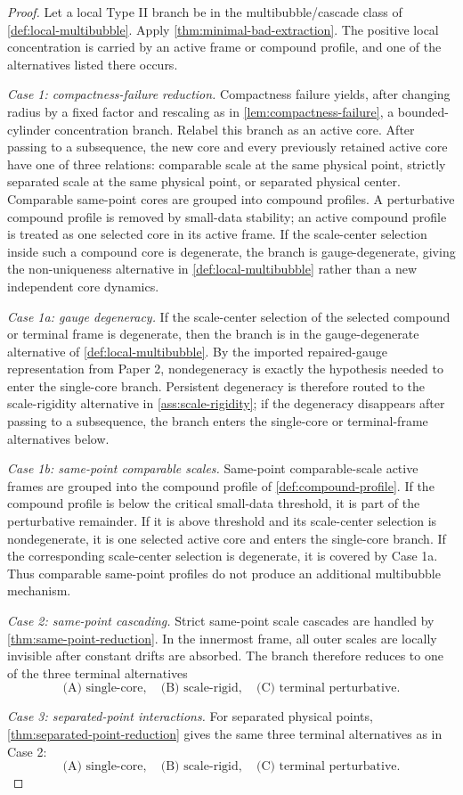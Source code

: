 \documentclass[11pt]{amsart}
\theoremstyle{plain}
\theoremstyle{definition}
\theoremstyle{remark}
\begin{document}
\begin{proof}
Let a local Type II branch be in the multibubble/cascade class of
\cref{def:local-multibubble}.  Apply \cref{thm:minimal-bad-extraction}.  The
positive local concentration is carried by an active frame or compound profile,
and one of the alternatives listed there occurs.
\par
\textit{Case 1: compactness-failure reduction.}
Compactness failure yields, after changing radius by a fixed factor and
rescaling as in \cref{lem:compactness-failure}, a bounded-cylinder concentration
branch.  Relabel this branch as an active core.  After passing to a subsequence,
the new core and every previously retained active core have one of three
relations: comparable scale at the same physical point, strictly separated scale
at the same physical point, or separated physical center.  Comparable same-point
cores are grouped into compound profiles.  A perturbative compound profile is
removed by small-data stability; an active compound profile is treated as one
selected core in its active frame.  If the scale-center selection inside such a
compound core is degenerate, the branch is gauge-degenerate, giving the
non-uniqueness alternative in \cref{def:local-multibubble} rather than a new
independent core dynamics.
\par
\textit{Case 1a: gauge degeneracy.}
If the scale-center selection of the selected compound or terminal frame is
degenerate, then the branch is in the gauge-degenerate alternative of
\cref{def:local-multibubble}.  By the imported repaired-gauge representation
from Paper 2, nondegeneracy is exactly the hypothesis needed to enter the
single-core branch.  Persistent degeneracy is therefore routed to the
scale-rigidity alternative in \cref{ass:scale-rigidity}; if the degeneracy
disappears after passing to a subsequence, the branch enters the single-core or
terminal-frame alternatives below.
\par
\textit{Case 1b: same-point comparable scales.}
Same-point comparable-scale active frames are grouped into the compound profile
of \cref{def:compound-profile}.  If the compound profile is below the critical
small-data threshold, it is part of the perturbative remainder.  If it is above
threshold and its scale-center selection is nondegenerate, it is one selected
active core and enters the single-core branch.  If the corresponding
scale-center selection is degenerate, it is covered by Case 1a.  Thus
comparable same-point profiles do not produce an additional multibubble
mechanism.
\par
\textit{Case 2: same-point cascading.}
Strict same-point scale cascades are handled by
\cref{thm:same-point-reduction}.  In the innermost frame, all outer scales are
locally invisible after constant drifts are absorbed.  The branch therefore
reduces to one of the three terminal alternatives
\[
  \text{(A) single-core},\quad \text{(B) scale-rigid},\quad \text{(C) terminal perturbative}.
\]
\par
\textit{Case 3: separated-point interactions.}
For separated physical points, \cref{thm:separated-point-reduction} gives the same
three terminal alternatives as in Case 2:
\[
  \text{(A) single-core},\quad \text{(B) scale-rigid},\quad \text{(C) terminal perturbative}.
\]


\end{proof}
\end{document}
